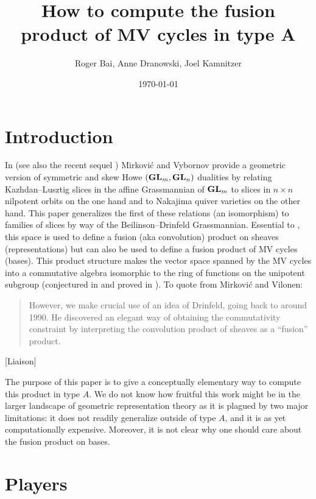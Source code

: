 \documentclass[draft]{article}
\title{How to compute the fusion product of MV cycles in type A}
\author{Roger Bai, Anne Dranowski, Joel Kamnitzer}
\date{\today}
\begin{document}
\maketitle

\section{Introduction}
\label{s:intro}
% 
In \cite{mirkovic2007quiver} (see also the recent sequel \cite{mirkovic2019comparison}) Mirkovi\'c and Vybornov provide a geometric version of symmetric and skew Howe $({\mathbf{GL}}_m,{\mathbf{GL}}_n)$ dualities by relating Kazhdan--Lusztig slices in the affine Grassmannian of ${\mathbf{GL}}_m$ to slices in $n\times n$ nilpotent orbits on the one hand 
and to Nakajima quiver varieties on the other hand. 
This paper generalizes the first of these relations (an isomorphism) to families of slices by way of the Beilinson--Drinfeld Grassmannian. 
Essential to \cite{mirkovic2007geometric}, this space is used to define a fusion (aka convolution) product on sheaves (representations) but can also be used to define a fusion product of MV cycles (bases). 
% 
This product structure makes the vector space spanned by the MV cycles into a commutative algebra isomorphic to the ring of functions on the unipotent subgroup (conjectured in \cite{anderson2003polytope} and proved in \cite{baumann2019mirkovic}). %
% 
To quote from Mirkovi\'c and Vilonen:
\begin{quotation}
    However, we make crucial use of an idea of Drinfeld, going back to around 1990. He discovered an elegant way of obtaining the commutativity constraint by interpreting the convolution product of sheaves as a ``fusion'' product.
\end{quotation}
% 
[Liaison]

The purpose of this paper is to give a conceptually elementary way to compute this product in type $A$. We do not know how fruitful this work might be in the larger landscape of geometric representation theory as it is plagued by two major limitations: it does not readily generalize outside of type $A$, and it is as yet computationally expensive. 
% 
Moreover, it is not clear why one should care about the fusion product on bases.     

\section{Players}
\label{s:players}
\end{document}
